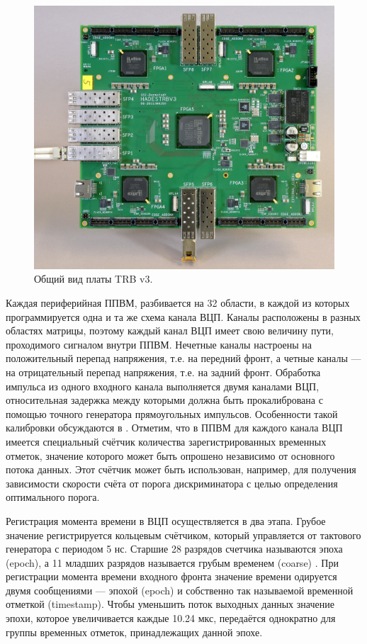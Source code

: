 \begin{figure}
\includegraphics[width=1.0\textwidth]{pictures/7_TRB3_crop.jpg}
\caption{Общий вид платы TRB v3.}
\label{fig:TRB}
\end{figure}

Каждая периферийная ППВМ, разбивается на 32 области, в каждой из которых программируется одна и та же схема канала ВЦП. Каналы расположены в разных областях матрицы, поэтому каждый канал ВЦП имеет свою величину пути, проходимого сигналом внутри ППВМ. Нечетные каналы настроены на положительный перепад напряжения, т.е. на передний фронт, а четные каналы --- на отрицательный перепад напряжения, т.е. на задний фронт. Обработка импульса из одного входного канала выполняется двумя каналами ВЦП, относительная задержка между которыми должна быть прокалибрована с помощью точного генератора прямоугольных импульсов. Особенности такой калибровки обсуждаются в \cite{}. Отметим, что в ППВМ для каждого канала ВЦП имеется специальный счётчик количества зарегистрированных временных отметок, значение которого может быть опрошено независимо от основного потока данных. Этот счётчик может быть использован, например, для получения зависимости скорости счёта от порога дискриминатора с целью определения оптимального порога.

Регистрация момента времени в ВЦП осуществляется в два этапа. Грубое значение регистрируется кольцевым счётчиком, который управляется от тактового генератора с периодом 5 нс. Старшие 28 разрядов счетчика называются эпоха (epoch), а 11 младших разрядов называется грубым временем (coarse) \cite{}. При регистрации момента времени входного фронта значение времени одируется двумя сообщениями --- эпохой (epoch) и собственно так называемой временной отметкой (timestamp). Чтобы уменьшить поток выходных данных значение эпохи, которое увеличивается каждые 10.24 мкс, передаётся однократно для группы временных отметок, принадлежащих данной эпохе.


